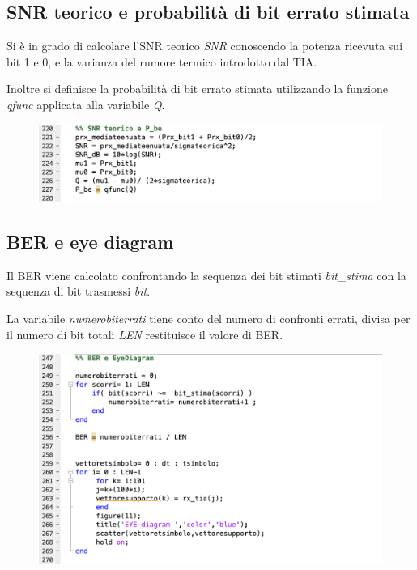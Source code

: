 \documentclass[12pt, a4paper]{article}
\begin{document}

\newpage
\subsection{SNR teorico e probabilità di bit errato stimata}
\label{sub:SNR}

Si è in grado di calcolare l'SNR teorico \textit{SNR} conoscendo la potenza ricevuta sui bit 1 e 0, e la varianza del rumore termico introdotto dal TIA.

Inoltre si definisce la probabilità di bit errato stimata utilizzando la funzione \textit{qfunc} applicata alla variabile \textit{Q}.

\begin{figure}[h!]
\centering
\includegraphics[scale=0.7]{SNR.png}
\caption{}
\label{}
\end{figure}


\subsection{BER e eye diagram}
\label{sub:BER}

\vspace{3mm}
Il BER viene calcolato confrontando la sequenza dei bit stimati \textit{bit\_stima} con la sequenza di bit trasmessi \textit{bit}.

La variabile \textit{numerobiterrati} tiene conto del numero di confronti errati, divisa per il numero di bit totali \textit{LEN} restituisce il valore di BER.

\vspace{2mm}
\begin{figure}[h!]
\centering
\includegraphics[scale=0.7]{BER.png}
\caption{}
\label{}
\end{figure}
\end{document}
